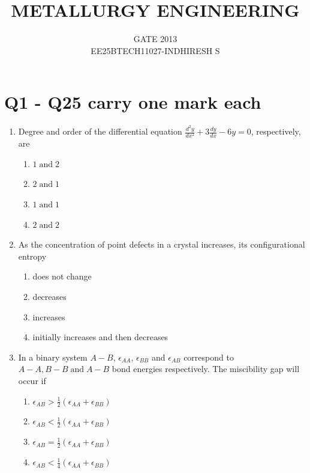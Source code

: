 \documentclass[journal]{IEEEtran}
\theoremstyle{remark}
\begin{document}

\onecolumn

\title{METALLURGY ENGINEERING}
\author{GATE 2013\\
EE25BTECH11027-INDHIRESH S}
\maketitle


\renewcommand{\thefigure}{\theenumi}
\renewcommand{\thetable}{\theenumi}

\section{Q1 - Q25 carry one mark each}
\begin{enumerate}
\item  Degree and order of the differential equation $\frac{d^2y}{dx^2} + 3\frac{dy}{dx}-6y =0$, respectively, are \hfill{}

\begin{multicols}{4}
\begin{enumerate}
\item $1\; \text{and}\; 2$ 
\item  $2 \;\text{and}\; 1$ 
\item $1 \;\text{and}\; 1$ 
\item $2 \;\text{and}\; 2$ 
\end{enumerate}
\end{multicols}

\item  As the concentration of point defects in a crystal increases, its configurational entropy
\hfill{}
\begin{multicols}{2}
\begin{enumerate}
\item does not change 
\item  decreases 
\item increases 
\item initially increases and then decreases 
\end{enumerate}
\end{multicols}

\item In a binary system $A-B$, $\epsilon_{AA}$, $\epsilon_{BB}$ and $\epsilon_{AB}$ correspond to $A-A, B-B\; \text{and}\; A-B$ bond energies respectively. The miscibility gap will occur if 
\hfill{}
\begin{multicols}{2}
\begin{enumerate}
\item $\epsilon_{AB} > \frac{1}{2} (\epsilon_{AA} + \epsilon_{BB}) $
\item  $\epsilon_{AB} < \frac{1}{2} (\epsilon_{AA} + \epsilon_{BB}) $
\item $\epsilon_{AB} = \frac{1}{2} (\epsilon_{AA} + \epsilon_{BB}) $
\item  $\epsilon_{AB} < \frac{1}{4} (\epsilon_{AA} + \epsilon_{BB}) $
\end{enumerate}
\end{multicols}


\end{enumerate}
\end{document}
